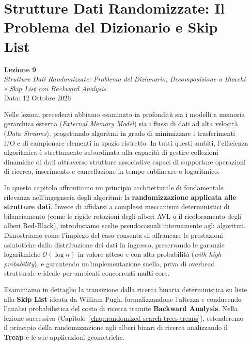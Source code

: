 \chapter{Strutture Dati Randomizzate: Il Problema del Dizionario e Skip List}
\label{chap:randomized-data-structures}

\begin{center}
  \textbf{Lezione 9}\\
  \emph{Strutture Dati Randomizzate: Problema del Dizionario, Decomposizione a Blocchi e Skip List con Backward Analysis}\\[0.5em]
  Data: 12 Ottobre 2026
\end{center}

Nelle lezioni precedenti abbiamo esaminato in profondità sia i modelli a memoria gerarchica esterna (\textit{External Memory Model}) sia i flussi di dati ad alta velocità (\textit{Data Streams}), progettando algoritmi in grado di minimizzare i trasferimenti I/O e di campionare elementi in spazio ristretto. In tutti questi ambiti, l'efficienza algoritmica è strettamente subordinata alla capacità di gestire collezioni dinamiche di dati attraverso strutture associative capaci di supportare operazioni di ricerca, inserimento e cancellazione in tempo sublineare o logaritmico.

In questo capitolo affrontiamo un principio architetturale di fondamentale rilevanza nell'ingegneria degli algoritmi: la \textbf{randomizzazione applicata alle strutture dati}. Invece di affidarsi a complessi meccanismi deterministici di bilanciamento (come le rigide rotazioni degli alberi AVL o il ricoloramento degli alberi Red-Black), introduciamo scelte pseudocasuali internamente agli algoritmi. Dimostriamo come l'impiego del caso consenta di affrancare le prestazioni asintotiche dalla distribuzione dei dati in ingresso, preservando le garanzie logaritmiche $\mathcal{O}(\log n)$ in valore atteso e con alta probabilità (\textit{with high probability}), e garantendo un'implementazione snella, priva di overhead strutturale e ideale per ambienti concorrenti multi-core.

Esaminiamo in dettaglio la transizione dalla ricerca binaria deterministica su liste alla \textbf{Skip List} ideata da William Pugh, formalizzandone l'altezza e conducendo l'analisi probabilistica del costo di ricerca tramite \textbf{Backward Analysis}. Nella lezione successiva (Capitolo~\ref{chap:randomized-search-trees-treaps}), estenderemo il principio della randomizzazione agli alberi binari di ricerca analizzando il \textbf{Treap} e le sue applicazioni geometriche.

